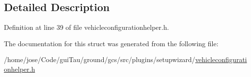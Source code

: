 \subsection{Detailed Description}


Definition at line 39 of file vehicleconfigurationhelper.\-h.



The documentation for this struct was generated from the following file\-:\begin{DoxyCompactItemize}
\item 
/home/jose/\-Code/gui\-Tau/ground/gcs/src/plugins/setupwizard/\hyperlink{vehicleconfigurationhelper_8h}{vehicleconfigurationhelper.\-h}\end{DoxyCompactItemize}
